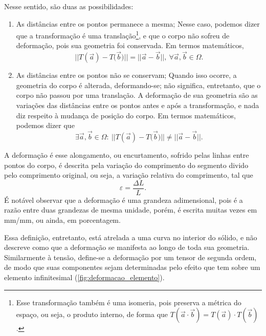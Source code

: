 Nesse sentido, são duas as possibilidades:
\begin{enumerate}
    \item As distâncias entre os pontos permanece a mesma;
        Nesse caso, podemos dizer que a transformação é uma translação\footnote{Esse transformação também é uma isomeria, pois preserva a métrica do espaço, ou seja, o produto interno, de forma que $ T(\vec{a} \cdot \vec{b}) = T(\vec{a}) \cdot T(\vec{b}) $.}, e que o corpo não sofreu de deformação, pois sua geometria foi conservada. Em termos matemáticos,
        \begin{equation}
            ||{T(\vec{a}) - T(\vec{b}})|| = ||{\vec{a} - \vec{b}}||, \ \forall \vec{a}, \vec{b} \in \Omega. 
        \end{equation}        
    \item As distâncias entre os pontos não se conservam;
        Quando isso ocorre, a geometria do corpo é alterada, deformando-se; não significa, entretanto, que o corpo não passou por uma translação. A deformação de sua geometria são as variações das distâncias entre os pontos antes e após a transformação, e nada diz respeito à mudança de posição do corpo. Em termos matemáticos, podemos dizer que
        \begin{equation}
             \exists \vec{a}, \vec{b} \in \Omega : \ ||{T(\vec{a}) - T(\vec{b}})|| \neq ||{\vec{a} - \vec{b}}||.
        \end{equation}
\end{enumerate}

A deformação é esse alongamento, ou encurtamento, sofrido pelas linhas entre pontos do corpo, é descrita pela variação do comprimento do segmento divido pelo comprimento original, ou seja, a variação relativa do comprimento, tal que
\begin{equation}
    \varepsilon = \frac{\Delta L}{L}.
\end{equation}
É notável observar que a deformação é uma grandeza adimensional, pois é a razão entre duas grandezas de mesma unidade, porém, é escrita muitas vezes em mm/mm, ou ainda, em porcentagem.

Essa definição, entretanto, está atrelada a uma curva no interior do sólido, e não descreve como que a deformação se manifesta ao longo de toda sua geometria. Similarmente à tensão, define-se a deformação por um tensor de segunda ordem, de modo que suas componentes sejam determinadas pelo efeito que tem sobre um elemento infinitesimal (\ref{fig:deformacao_elemento}). \cite{roylance}

